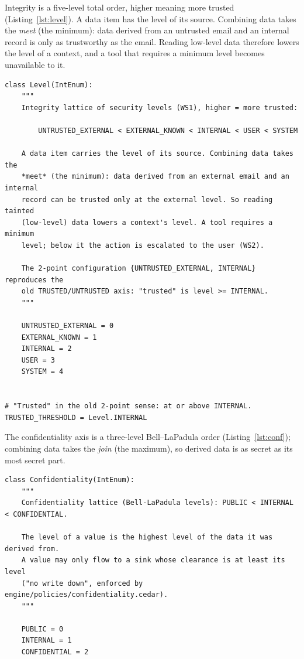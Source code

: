 \documentclass[11pt,a4paper]{article}
\begin{document}
Integrity is a five-level total order, higher meaning more trusted
(Listing~\ref{lst:level}). A data item has the level of its source. Combining data takes
the \emph{meet} (the minimum): data derived from an untrusted email and an internal record
is only as trustworthy as the email. Reading low-level data therefore lowers the level of
a context, and a tool that requires a minimum level becomes unavailable to it.

\begin{lstlisting}[firstnumber=11,style=py,caption={Integrity lattice (\texttt{state.py}, lines 11--35)},label={lst:level}]
class Level(IntEnum):
    """
    Integrity lattice of security levels (WS1), higher = more trusted:

        UNTRUSTED_EXTERNAL < EXTERNAL_KNOWN < INTERNAL < USER < SYSTEM

    A data item carries the level of its source. Combining data takes the
    *meet* (the minimum): data derived from an external email and an internal
    record can be trusted only at the external level. So reading tainted
    (low-level) data lowers a context's level. A tool requires a minimum
    level; below it the action is escalated to the user (WS2).

    The 2-point configuration {UNTRUSTED_EXTERNAL, INTERNAL} reproduces the
    old TRUSTED/UNTRUSTED axis: "trusted" is level >= INTERNAL.
    """

    UNTRUSTED_EXTERNAL = 0
    EXTERNAL_KNOWN = 1
    INTERNAL = 2
    USER = 3
    SYSTEM = 4


# "Trusted" in the old 2-point sense: at or above INTERNAL.
TRUSTED_THRESHOLD = Level.INTERNAL
\end{lstlisting}

The confidentiality axis is a three-level Bell--LaPadula order
(Listing~\ref{lst:conf}); combining data takes the \emph{join} (the maximum), so derived
data is as secret as its most secret part.

\begin{lstlisting}[firstnumber=38,style=py,caption={Confidentiality lattice (\texttt{state.py}, lines 38--49)},label={lst:conf}]
class Confidentiality(IntEnum):
    """
    Confidentiality lattice (Bell-LaPadula levels): PUBLIC < INTERNAL < CONFIDENTIAL.

    The level of a value is the highest level of the data it was derived from.
    A value may only flow to a sink whose clearance is at least its level
    ("no write down", enforced by engine/policies/confidentiality.cedar).
    """

    PUBLIC = 0
    INTERNAL = 1
    CONFIDENTIAL = 2
\end{lstlisting}
\end{document}
